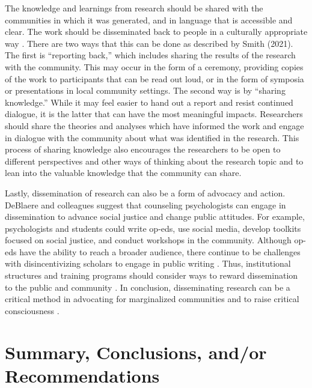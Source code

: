\documentclass[
  11pt,
]{book}
\begin{document}
The knowledge and learnings from research should be shared with the communities in which it was generated, and in language that is accessible and clear. The work should be disseminated back to people in a culturally appropriate way \citep{smith_decolonizing_2021}. There are two ways that this can be done as described by Smith (2021). The first is ``reporting back,'' which includes sharing the results of the research with the community. This may occur in the form of a ceremony, providing copies of the work to participants that can be read out loud, or in the form of symposia or presentations in local community settings. The second way is by ``sharing knowledge.'' While it may feel easier to hand out a report and resist continued dialogue, it is the latter that can have the most meaningful impacts. Researchers should share the theories and analyses which have informed the work and engage in dialogue with the community about what was identified in the research. This process of sharing knowledge also encourages the researchers to be open to different perspectives and other ways of thinking about the research topic and to lean into the valuable knowledge that the community can share.

Lastly, dissemination of research can also be a form of advocacy and action. DeBlaere and colleagues \citeyearpar{deblaere_social_2019} suggest that counseling psychologists can engage in dissemination to advance social justice and change public attitudes. For example, psychologists and students could write op-eds, use social media, develop toolkits focused on social justice, and conduct workshops in the community. Although op-eds have the ability to reach a broader audience, there continue to be challenges with disincentivizing scholars to engage in public writing \citep{deblaere_social_2019}. Thus, institutional structures and training programs should consider ways to reward dissemination to the public and community \citep{buchanan_upending_2021}. In conclusion, disseminating research can be a critical method in advocating for marginalized communities and to raise critical consciousness \citep{fassinger_toward_2013}.

\section{Summary, Conclusions, and/or Recommendations}\label{summary-conclusions-andor-recommendations-1}
\end{document}
